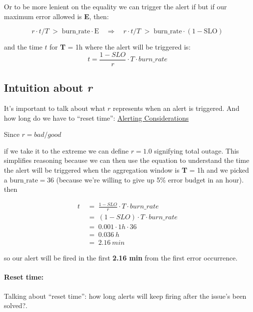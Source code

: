 \documentclass{article}
\begin{document}
Or to be more lenient on the equality we can trigger the alert if
but if our maximum error allowed is \textbf{E}, then:

\[
r \cdot t/T \;>\; \mathrm{burn\_rate} \cdot \mathrm{E} \quad \Rightarrow \quad r \cdot t/T \;>\; \mathrm{burn\_rate} \cdot \mathrm{(1 - SLO)}
\]

and the time $t$ for \textbf{T} = 1h where the alert will be triggered is:
\[
t = \frac{1 - SLO}{r} \cdot T \cdot burn\_rate
\]

\subsection{Intuition about \emph{r}}

It’s important to talk about what $r$ represents when an alert is triggered. And how long do we have to ``reset time'': \href{https://sre.google/workbook/alerting-on-slos/#:~:text=Alerting%20Considerations}{Alerting Considerations}

\quad

Since $r = bad/good$

\quad

if we take it to the extreme we can define $r = 1.0$ signifying total outage. This simplifies reasoning because we can then use the equation to understand the time the alert will be triggered when the aggregation window is \textbf{T} = 1h and we picked a $\mathrm{burn\_rate} = 36$ (because we're willing to give up 5\% error budget in an hour). then

\begin{align*}
t & \;=\; \frac{1 - SLO}{r} \cdot T \cdot burn\_rate \\
& \;=\; (1  -SLO) \cdot T \cdot burn\_rate \\
& \;=\; 0.001 \cdot 1h \cdot 36 \\
& \;=\; 0.036\ h \\
& \;=\; 2.16\ min
\end{align*}

so our alert will be fired in the first \textbf{2.16 min} from the first error occurrence.

\quad

\paragraph{Reset time:}
Talking about ``reset time'': how long alerts will keep firing after the issue's been solved?.

\quad
\end{document}
